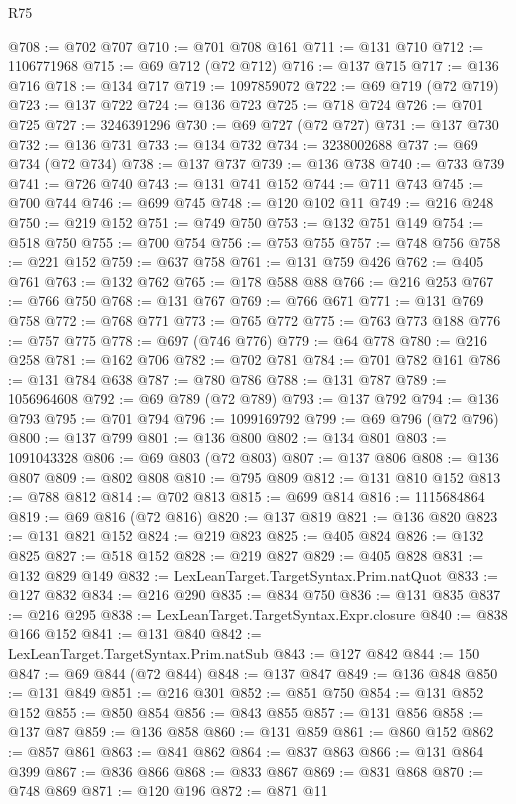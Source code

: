 \begin{lexlean}{R75}
\begin{coremodule}
@708 := @702 @707
@710 := @701 @708 @161
@711 := @131 @710
@712 := 1106771968
@715 := @69 @712 (@72 @712)
@716 := @137 @715
@717 := @136 @716
@718 := @134 @717
@719 := 1097859072
@722 := @69 @719 (@72 @719)
@723 := @137 @722
@724 := @136 @723
@725 := @718 @724
@726 := @701 @725
@727 := 3246391296
@730 := @69 @727 (@72 @727)
@731 := @137 @730
@732 := @136 @731
@733 := @134 @732
@734 := 3238002688
@737 := @69 @734 (@72 @734)
@738 := @137 @737
@739 := @136 @738
@740 := @733 @739
@741 := @726 @740
@743 := @131 @741 @152
@744 := @711 @743
@745 := @700 @744
@746 := @699 @745
@748 := @120 @102 @11
@749 := @216 @248
@750 := @219 @152
@751 := @749 @750
@753 := @132 @751 @149
@754 := @518 @750
@755 := @700 @754
@756 := @753 @755
@757 := @748 @756
@758 := @221 @152
@759 := @637 @758
@761 := @131 @759 @426
@762 := @405 @761
@763 := @132 @762
@765 := @178 @588 @88
@766 := @216 @253
@767 := @766 @750
@768 := @131 @767
@769 := @766 @671
@771 := @131 @769 @758
@772 := @768 @771
@773 := @765 @772
@775 := @763 @773 @188
@776 := @757 @775
@778 := @697 (@746 @776)
@779 := @64 @778
@780 := @216 @258
@781 := @162 @706
@782 := @702 @781
@784 := @701 @782 @161
@786 := @131 @784 @638
@787 := @780 @786
@788 := @131 @787
@789 := 1056964608
@792 := @69 @789 (@72 @789)
@793 := @137 @792
@794 := @136 @793
@795 := @701 @794
@796 := 1099169792
@799 := @69 @796 (@72 @796)
@800 := @137 @799
@801 := @136 @800
@802 := @134 @801
@803 := 1091043328
@806 := @69 @803 (@72 @803)
@807 := @137 @806
@808 := @136 @807
@809 := @802 @808
@810 := @795 @809
@812 := @131 @810 @152
@813 := @788 @812
@814 := @702 @813
@815 := @699 @814
@816 := 1115684864
@819 := @69 @816 (@72 @816)
@820 := @137 @819
@821 := @136 @820
@823 := @131 @821 @152
@824 := @219 @823
@825 := @405 @824
@826 := @132 @825
@827 := @518 @152
@828 := @219 @827
@829 := @405 @828
@831 := @132 @829 @149
@832 := LexLeanTarget.TargetSyntax.Prim.natQuot
@833 := @127 @832
@834 := @216 @290
@835 := @834 @750
@836 := @131 @835
@837 := @216 @295
@838 := LexLeanTarget.TargetSyntax.Expr.closure
@840 := @838 @166 @152
@841 := @131 @840
@842 := LexLeanTarget.TargetSyntax.Prim.natSub
@843 := @127 @842
@844 := 150
@847 := @69 @844 (@72 @844)
@848 := @137 @847
@849 := @136 @848
@850 := @131 @849
@851 := @216 @301
@852 := @851 @750
@854 := @131 @852 @152
@855 := @850 @854
@856 := @843 @855
@857 := @131 @856
@858 := @137 @87
@859 := @136 @858
@860 := @131 @859
@861 := @860 @152
@862 := @857 @861
@863 := @841 @862
@864 := @837 @863
@866 := @131 @864 @399
@867 := @836 @866
@868 := @833 @867
@869 := @831 @868
@870 := @748 @869
@871 := @120 @196
@872 := @871 @11

\end{coremodule}
\end{lexlean}
